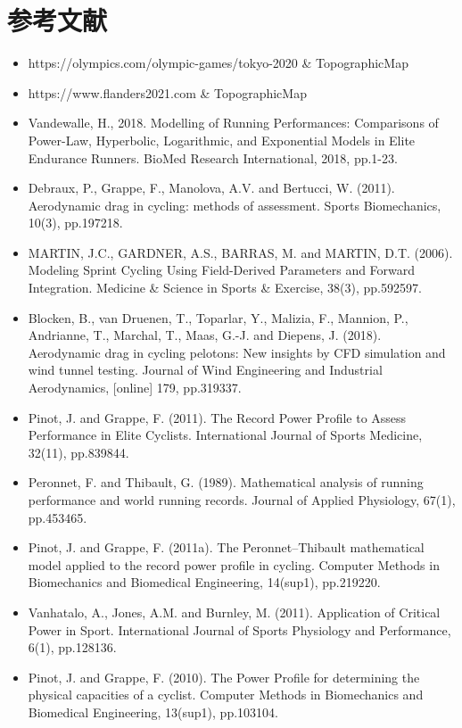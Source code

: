 \documentclass[11pt,a4paper]{ctexart}
\begin{document}
\section*{参考文献}

\begin{itemize}
\item[{[1]}] https://olympics.com/olympic-games/tokyo-2020 \& TopographicMap
\item[{[2]}] https://www.flanders2021.com \& TopographicMap
\item[{[3]}] Vandewalle, H., 2018. Modelling of Running Performances: Comparisons of Power-Law, Hyperbolic, Logarithmic, and Exponential Models in Elite Endurance Runners. BioMed Research International, 2018, pp.1-23.
\item[{[4]}] Debraux, P., Grappe, F., Manolova, A.V. and Bertucci, W. (2011). Aerodynamic drag in cycling: methods of assessment. Sports Biomechanics, 10(3), pp.197218.
\item[{[5]}] MARTIN, J.C., GARDNER, A.S., BARRAS, M. and MARTIN, D.T. (2006). Modeling Sprint Cycling Using Field-Derived Parameters and Forward Integration. Medicine \& Science in Sports \& Exercise, 38(3), pp.592597.
\item[{[6]}] Blocken, B., van Druenen, T., Toparlar, Y., Malizia, F., Mannion, P., Andrianne, T., Marchal, T., Maas, G.-J. and Diepens, J. (2018). Aerodynamic drag in cycling pelotons: New insights by CFD simulation and wind tunnel testing. Journal of Wind Engineering and Industrial Aerodynamics, [online] 179, pp.319337.
\item[{[7]}] Pinot, J. and Grappe, F. (2011). The Record Power Profile to Assess Performance in Elite Cyclists. International Journal of Sports Medicine, 32(11), pp.839844.
\item[{[8]}] Peronnet, F. and Thibault, G. (1989). Mathematical analysis of running performance and world running records. Journal of Applied Physiology, 67(1), pp.453465.
\item[{[9]}] Pinot, J. and Grappe, F. (2011a). The Peronnet--Thibault mathematical model applied to the record power profile in cycling. Computer Methods in Biomechanics and Biomedical Engineering, 14(sup1), pp.219220.
\item[{[10]}] Vanhatalo, A., Jones, A.M. and Burnley, M. (2011). Application of Critical Power in Sport. International Journal of Sports Physiology and Performance, 6(1), pp.128136.
\item[{[11]}] Pinot, J. and Grappe, F. (2010). The Power Profile for determining the physical capacities of a cyclist. Computer Methods in Biomechanics and Biomedical Engineering, 13(sup1), pp.103104.

\end{itemize}
\end{document}
